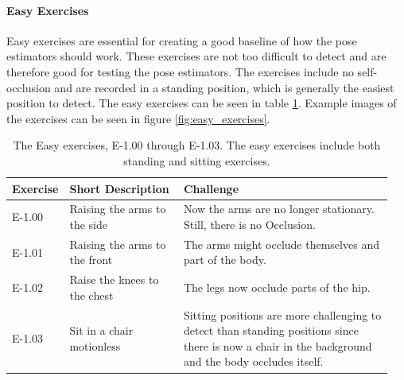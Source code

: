 \paragraph{Easy Exercises}

Easy exercises are essential for creating a good baseline of how the pose estimators should work. These exercises are not too difficult to detect and are therefore good for testing the pose estimators. The exercises include no self-occlusion and are recorded in a standing position, which is generally the easiest position to detect. The easy exercises can be seen in table \ref{tab:easy_exercises}. Example images of the exercises can be seen in figure \ref{fig:easy_exercises}.

\begin{table}[ht]
  \caption[Easy Exercises]{The Easy exercises, E-1.00 through E-1.03. The easy exercises include both standing and sitting exercises.}
  \label{tab:easy_exercises}
  \begin{tabular}{p{0.1\linewidth}p{0.3\linewidth}p{0.55\linewidth}}
  \hline
  Exercise & Short Description             & Challenge \\ \hline
  E-1.00   & Raising the arms to the side  & Now the arms are no longer stationary. Still, there is no Occlusion. \\
  E-1.01   & Raising the arms to the front & The arms might occlude themselves and part of the body.  \\
  E-1.02   & Raise the knees to the chest  & The legs now occlude parts of the hip.  \\
  E-1.03   & Sit in a chair motionless     & Sitting positions are more challenging to detect than standing positions since there is now a chair in the background and the body occludes itself.\\ \hline
  \end{tabular}
  \end{table}



